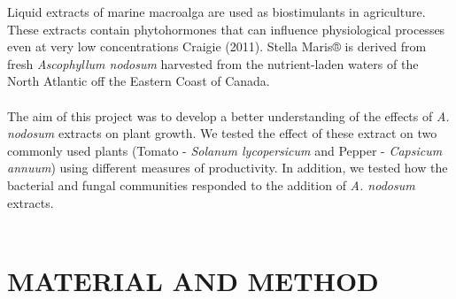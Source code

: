 \documentclass[11pt,]{article}
\begin{document}
Liquid extracts of marine macroalga are used as biostimulants in
agriculture. These extracts contain phytohormones that can influence
physiological processes even at very low concentrations Craigie (2011).
Stella Maris® is derived from fresh \emph{Ascophyllum nodosum} harvested
from the nutrient-laden waters of the North Atlantic off the Eastern
Coast of Canada.\\
\hspace*{0.333em}\\
The aim of this project was to develop a better understanding of the
effects of \emph{A. nodosum} extracts on plant growth. We tested the
effect of these extract on two commonly used plants (Tomato -
\emph{Solanum lycopersicum} and Pepper - \emph{Capsicum annuum}) using
different measures of productivity. In addition, we tested how the
bacterial and fungal communities responded to the addition of \emph{A.
nodosum} extracts.\\
\hspace*{0.333em} ~

\section{MATERIAL AND METHOD}\label{material-and-method}
\end{document}
